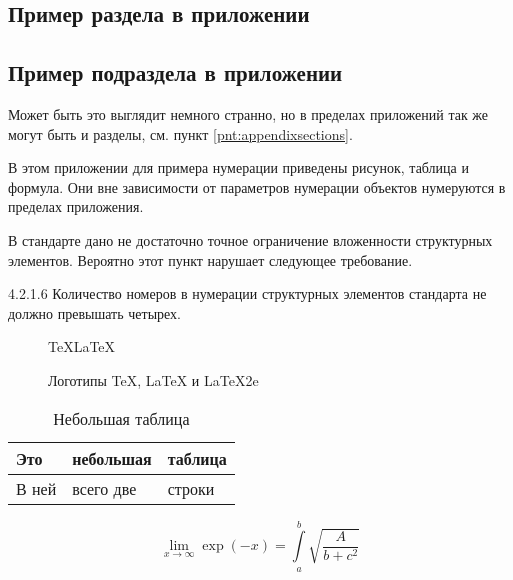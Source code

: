 \documentclass[12pt, twoside, final]{ruost}
\begin{document}
\begin{OST}
		
			\section{Пример раздела в приложении}
			
				\subsection{Пример подраздела в приложении}
				
					\point Может быть это выглядит немного странно, но в пределах приложений так же могут быть и разделы, см. пункт \ref{pnt:appendixsections}.
		
					\point В этом приложении для примера нумерации приведены рисунок, таблица и формула. Они вне зависимости от параметров нумерации объектов нумеруются в пределах приложения.
					
						\subpoint В стандарте дано не достаточно точное ограничение вложенности структурных элементов. Вероятно этот пункт нарушает следующее требование.
						
						\begin{stdquote}
							\par 4.2.1.6 Количество номеров в нумерации структурных элементов стандарта не должно превышать четырех.
							\par [ГОСТ 1.5---2001]
						\end{stdquote}
					
					\begin{figure}[H]
						\centering
						\LARGE\TeX\quad\LaTeX\quad\LaTeXe\\
						\caption{Логотипы TeX, LaTeX и LaTeX2e}
					\end{figure}
					
					\begin{table}[H]
						\caption{Небольшая таблица}
						\begin{tabu}{|X[r]|X[c]|X[l]|}
							\hline
							Это    & небольшая & таблица \\ \hline
							В ней  & всего две & строки  \\ \hline
						\end{tabu}
					\end{table}
					
					\begin{equation}
						\lim_{x \to \infty} \exp(-x) = \int\limits_a^b \sqrt{\frac{A}{b + c^2}}
					\end{equation}
		

\end{OST}
\end{document}
